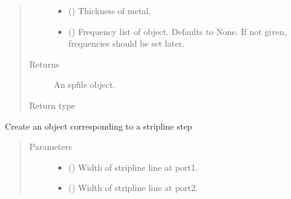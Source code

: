 \documentclass[letterpaper,10pt,english]{sphinxmanual}
\begin{document}
\begin{fulllineitems}
\begin{fulllineitems}
\begin{quote}
\begin{description}
\begin{itemize}
\item {} 
 () \textendash{} Thickness of metal.

\item {} 
 (\sphinxstyleliteralemphasis{\sphinxupquote{, }}) \textendash{} Frequency list of object. Defaults to None. If not given, frequencies should be set later.

\end{itemize}

\item[{Returns}] \leavevmode
An spfile object.

\item[{Return type}] \leavevmode
{\hyperref[\detokenize{touchstone:touchstone.spfile}]{}}

\end{description}\end{quote}

\end{fulllineitems}


\begin{fulllineitems}
\label{\detokenize{touchstone:touchstone.spfile.striplinestep}}
Create an  object corresponding to a stripline step
\begin{quote}\begin{description}
\item[{Parameters}] \leavevmode\begin{itemize}
\item {} 
 () \textendash{} Width of stripline line at port\sphinxhyphen{}1.

\item {} 
 () \textendash{} Width of stripline line at port\sphinxhyphen{}2.


\end{itemize}
\end{description}
\end{quote}
\end{fulllineitems}
\end{fulllineitems}
\end{document}
